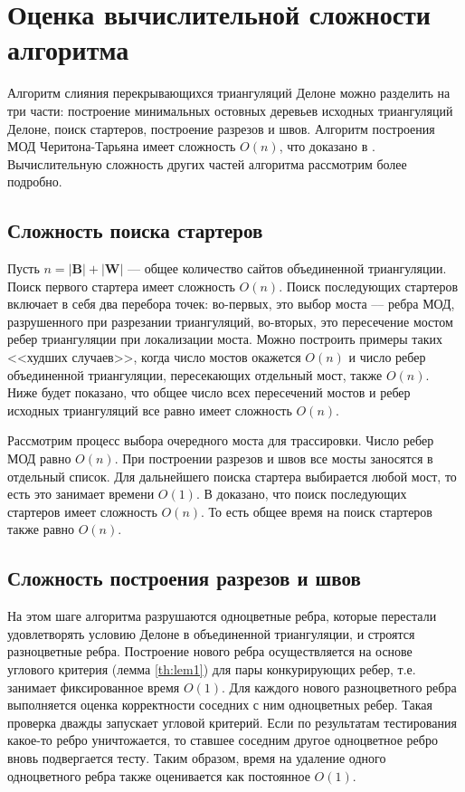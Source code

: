 \documentclass[12pt]{article}
\begin{document}
\section{Оценка вычислительной сложности алгоритма}
Алгоритм слияния перекрывающихся триангуляций Делоне можно разделить на три части:
построение минимальных остовных деревьев исходных триангуляций Делоне,
поиск стартеров, построение разрезов и швов.
Алгоритм построения МОД Черитона-Тарьяна имеет сложность $O(n)$, что доказано в \cite{Preparata}.
Вычислительную сложность других частей алгоритма рассмотрим более подробно.

\subsection{Сложность поиска стартеров}
Пусть $n = |\textbf{B}| + |\textbf{W}|$ --- общее количество сайтов объединенной триангуляции.
Поиск первого стартера имеет сложность $O(n)$.
Поиск последующих стартеров включает в себя два перебора точек:
во-первых, это выбор моста –-- ребра МОД, разрушенного при разрезании триангуляций,
во-вторых, это пересечение мостом ребер триангуляции при локализации моста.
Можно построить примеры таких <<худших случаев>>, когда число мостов окажется $O(n)$ и
число ребер объединенной триангуляции, пересекающих отдельный мост, также $O(n)$.
Ниже будет показано, что общее число всех пересечений мостов и ребер исходных триангуляций все равно имеет сложность $O(n)$.

Рассмотрим процесс выбора очередного моста для трассировки.
Число ребер МОД равно $O(n)$.
При построении разрезов и швов все мосты заносятся в отдельный список.
Для дальнейшего поиска стартера выбирается любой мост, то есть это занимает времени $O(1)$.
В \cite{MestOverlap} доказано, что поиск последующих стартеров имеет сложность $O(n)$.
То есть общее время на поиск стартеров также равно $O(n)$.

\subsection{Сложность построения разрезов и швов}
На этом шаге алгоритма разрушаются одноцветные ребра,
которые перестали удовлетворять условию Делоне в объединенной триангуляции,
и строятся разноцветные ребра.
Построение нового ребра осуществляется на основе углового критерия (лемма \ref{th:lem1}) для пары конкурирующих ребер,
т.е. занимает фиксированное время $O(1)$.
Для каждого нового разноцветного ребра выполняется оценка корректности соседних с ним одноцветных ребер.
Такая проверка дважды запускает угловой критерий.
Если по результатам тестирования какое-то ребро уничтожается, то ставшее соседним другое одноцветное ребро вновь подвергается тесту.
Таким образом, время на удаление одного одноцветного ребра также оценивается как постоянное $O(1)$.
\end{document}
